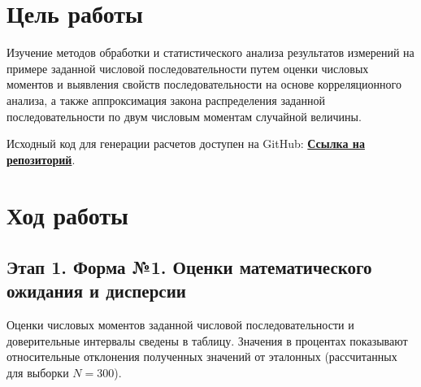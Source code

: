 \documentclass[a4paper,12pt]{article}
\begin{document}
\setcounter{page}{2}

\newpage

\tableofcontents

\newpage


\section*{Цель работы}
Изучение методов обработки и статистического анализа результатов измерений на примере заданной числовой последовательности путем оценки числовых моментов и выявления свойств последовательности на основе корреляционного анализа, а также аппроксимация закона распределения заданной последовательности по двум числовым моментам случайной величины.

Исходный код для генерации расчетов доступен на GitHub: \href{https://github.com/Axe-On-You/Modeling/tree/main/%D0%9B%D0%B0%D0%B11/%D0%9A%D0%BE%D0%B4}{\textbf{Ссылка на репозиторий}}.

\section*{Ход работы}

\subsection*{Этап 1. Форма №1. Оценки математического ожидания и дисперсии}
Оценки числовых моментов заданной числовой последовательности и доверительные интервалы сведены в таблицу. Значения в процентах показывают относительные отклонения полученных значений от эталонных (рассчитанных для выборки $N=300$).
\end{document}
